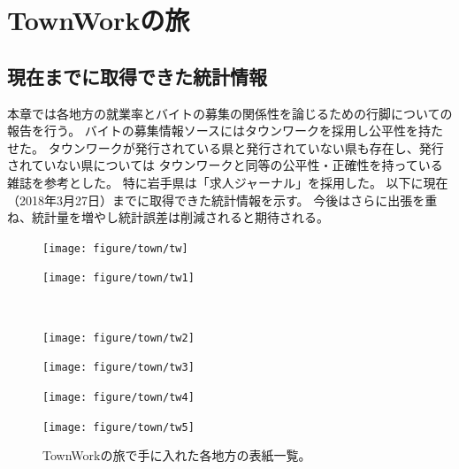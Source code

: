 \documentclass[12pt]{jsarticle}
\begin{document}
\section{TownWorkの旅}
\subsection{現在までに取得できた統計情報}
本章では各地方の就業率とバイトの募集の関係性を論じるための行脚についての報告を行う。
バイトの募集情報ソースにはタウンワークを採用し公平性を持たせた。
タウンワークが発行されている県と発行されていない県も存在し、発行されていない県については
タウンワークと同等の公平性・正確性を持っている雑誌を参考とした。
特に岩手県は「求人ジャーナル」を採用した。
以下に現在（2018年3月27日）までに取得できた統計情報を示す。
今後はさらに出張を重ね、統計量を増やし統計誤差は削減されると期待される。

\begin{figure}[htbp]
\vspace{-10mm}
    \centering
  \begin{minipage}{0.4\linewidth}
    \centering
    \texttt{[image: figure/town/tw]}
  \end{minipage}
  \begin{minipage}{0.4\linewidth}
    \centering
    \texttt{[image: figure/town/tw1]}
  \end{minipage}\\
  \begin{minipage}{0.4\linewidth}
    \centering
    \texttt{[image: figure/town/tw2]}
  \end{minipage}
  \begin{minipage}{0.4\linewidth}
    \centering
    \texttt{[image: figure/town/tw3]}
  \end{minipage}
  \begin{minipage}{0.4\linewidth}
    \centering
    \texttt{[image: figure/town/tw4]}
  \end{minipage}
  \begin{minipage}{0.4\linewidth}
    \centering
    \texttt{[image: figure/town/tw5]}
  \end{minipage}
  \caption{TownWorkの旅で手に入れた各地方の表紙一覧。}
  \label{CscDetaDphi-CSide}
\end{figure}
\end{document}
